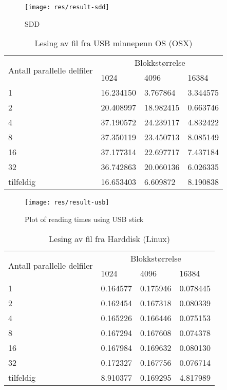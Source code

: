 \documentclass[titlepage]{article}
\begin{document}
\begin{figure}[h!]
  \caption{SDD}
  \centering
  \texttt{[image: res/result-sdd]}
\end{figure}


\begin{table}[h!]
\caption{Lesing av fil fra USB minnepenn OS (OSX)}
\label{USB}
\centering
\begin{tabular}{|l|l|l|l|}
\hline
\multirow{2}{*}{ Antall parallelle delfiler} & \multicolumn{3}{|c|}{Blokkstørrelse} \\
 & 1024 & 4096 & 16384\\
\hline
1         &  16.234150 &   3.767864 &  3.344575 \\
2         &  20.408997 &  18.982415 &  0.663746 \\
4         &  37.190572 &  24.239117 &  4.832422 \\
8         &  37.350119 &  23.450713 &  8.085149 \\
16        &  37.177314 &  22.697717 &  7.437184 \\
32        &  36.742863 &  20.060136 &  6.026335 \\
tilfeldig &  16.653403 &   6.609872 &  8.190838 \\
\hline
\end{tabular}
\end{table}

\begin{figure}[h!]
  \caption{Plot of reading times using USB stick}
  \centering
  \texttt{[image: res/result-usb]}
\end{figure}

\begin{table}[h!]
\caption{Lesing av fil fra Harddisk (Linux)}
\label{HDD}
\centering
\begin{tabular}{|l|l|l|l|}
\hline
\multirow{2}{*}{ Antall parallelle delfiler} & \multicolumn{3}{|c|}{Blokkstørrelse} \\
 & 1024 & 4096 & 16384\\
\hline
1         &  0.164577 &  0.175946 & 0.078445 \\
2         &  0.162454 &  0.167318 & 0.080339 \\
4         &  0.165226 &  0.166446 & 0.075153 \\
8         &  0.167294 &  0.167608 & 0.074378 \\
16        &  0.167984 &  0.169632 & 0.080130 \\
32        &  0.172327 &  0.167756 & 0.076714 \\
tilfeldig &  8.910377 &  0.169295 & 4.817989 \\
\hline
\end{tabular}
\end{table}
\end{document}
